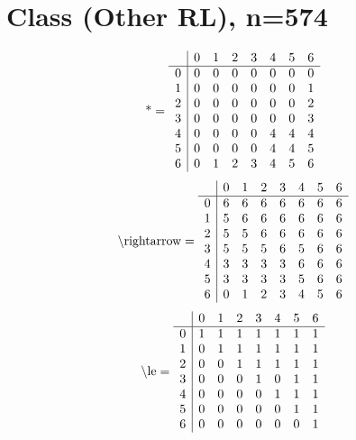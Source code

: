 \documentclass[11pt]{article}
\begin{document}
\section{Class (Other RL), n=574}
\[\text{*} = 
\begin{array}{r | r r r r r r r}
 & 0 & 1 & 2 & 3 & 4 & 5 & 6 \\ \hline
0 & 0 & 0 & 0 & 0 & 0 & 0 & 0 \\
1 & 0 & 0 & 0 & 0 & 0 & 0 & 1 \\
2 & 0 & 0 & 0 & 0 & 0 & 0 & 2 \\
3 & 0 & 0 & 0 & 0 & 0 & 0 & 3 \\
4 & 0 & 0 & 0 & 0 & 4 & 4 & 4 \\
5 & 0 & 0 & 0 & 0 & 4 & 4 & 5 \\
6 & 0 & 1 & 2 & 3 & 4 & 5 & 6 \\
\end{array}
\]
\[\text{\textbackslash rightarrow} = 
\begin{array}{r | r r r r r r r}
 & 0 & 1 & 2 & 3 & 4 & 5 & 6 \\ \hline
0 & 6 & 6 & 6 & 6 & 6 & 6 & 6 \\
1 & 5 & 6 & 6 & 6 & 6 & 6 & 6 \\
2 & 5 & 5 & 6 & 6 & 6 & 6 & 6 \\
3 & 5 & 5 & 5 & 6 & 5 & 6 & 6 \\
4 & 3 & 3 & 3 & 3 & 6 & 6 & 6 \\
5 & 3 & 3 & 3 & 3 & 5 & 6 & 6 \\
6 & 0 & 1 & 2 & 3 & 4 & 5 & 6 \\
\end{array}
\]
\[\text{\textbackslash le} = 
\begin{array}{r | r r r r r r r}
 & 0 & 1 & 2 & 3 & 4 & 5 & 6 \\ \hline
0 & 1 & 1 & 1 & 1 & 1 & 1 & 1 \\
1 & 0 & 1 & 1 & 1 & 1 & 1 & 1 \\
2 & 0 & 0 & 1 & 1 & 1 & 1 & 1 \\
3 & 0 & 0 & 0 & 1 & 0 & 1 & 1 \\
4 & 0 & 0 & 0 & 0 & 1 & 1 & 1 \\
5 & 0 & 0 & 0 & 0 & 0 & 1 & 1 \\
6 & 0 & 0 & 0 & 0 & 0 & 0 & 1 \\
\end{array}
\]
\end{document}
